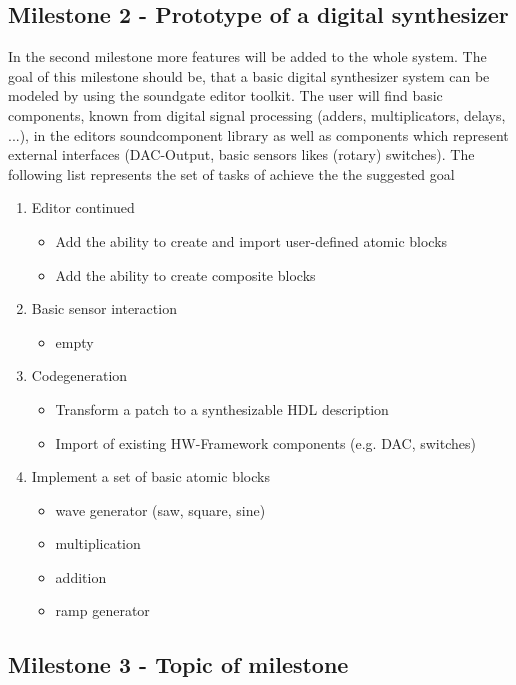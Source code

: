\subsection{Milestone 2 - Prototype of a digital synthesizer}

In the second milestone more features will be added to the whole system. The goal of this milestone should be, that a basic digital synthesizer system can be modeled by using the soundgate editor toolkit. The user will find basic components, known from digital signal processing (adders, multiplicators, delays, ...), in the editors soundcomponent library as well as components which represent external interfaces (DAC-Output, basic sensors likes (rotary) switches). The following list represents the set of tasks of achieve the the suggested goal

	\begin{enumerate}
		\item Editor continued
			\begin{itemize}
				\item Add the ability to create and import user-defined atomic blocks
				\item Add the ability to create composite blocks
			\end{itemize}
		\item Basic sensor interaction
			\begin{itemize}
			\item empty
			\end{itemize}
		\item Codegeneration	
			\begin{itemize}
				\item Transform a patch to a synthesizable HDL description
				\item Import of existing HW-Framework components (e.g. DAC, switches)
			\end{itemize}
		\item Implement a set of basic atomic blocks
			\begin{itemize}
				\item wave generator (saw, square, sine)
				\item multiplication
				\item addition
				\item ramp generator
			\end{itemize}
	\end{enumerate}

\subsection{Milestone 3 - Topic of milestone}
	
